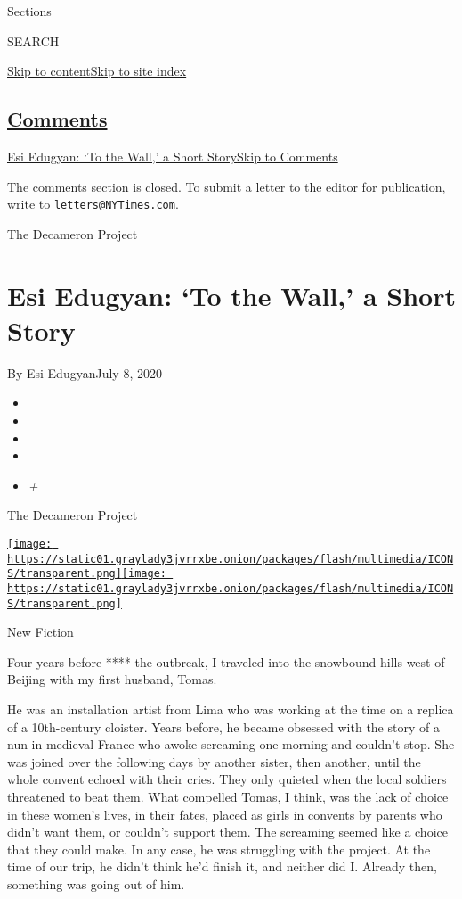 Sections

SEARCH

\protect\hyperlink{site-content}{Skip to
content}\protect\hyperlink{site-index}{Skip to site index}

\hypertarget{comments}{%
\subsection{\texorpdfstring{\protect\hyperlink{commentsContainer}{Comments}}{Comments}}\label{comments}}

\href{}{Esi Edugyan: `To the Wall,' a Short Story}\href{}{Skip to
Comments}

The comments section is closed. To submit a letter to the editor for
publication, write to
\href{mailto:letters@NYTimes.com}{\nolinkurl{letters@NYTimes.com}}.

The Decameron Project

\hypertarget{esi-edugyan-to-the-wall-a-short-story}{%
\section{Esi Edugyan: `To the Wall,' a Short
Story}\label{esi-edugyan-to-the-wall-a-short-story}}

By Esi EdugyanJuly 8, 2020

\begin{itemize}
\item
\item
\item
\item
\item
  \emph{+}
\end{itemize}

The Decameron Project

\href{https://www.nytimes3xbfgragh.onion/section/magazine}{\texttt{[image: https://static01.graylady3jvrrxbe.onion/packages/flash/multimedia/ICONS/transparent.png]}\texttt{[image: https://static01.graylady3jvrrxbe.onion/packages/flash/multimedia/ICONS/transparent.png]}}

New Fiction

Four years before **** the outbreak, I traveled into the snowbound hills
west of Beijing with my first husband, Tomas.

He was an installation artist from Lima who was working at the time on a
replica of a 10th-century cloister. Years before, he became obsessed
with the story of a nun in medieval France who awoke screaming one
morning and couldn't stop. She was joined over the following days by
another sister, then another, until the whole convent echoed with their
cries. They only quieted when the local soldiers threatened to beat
them. What compelled Tomas, I think, was the lack of choice in these
women's lives, in their fates, placed as girls in convents by parents
who didn't want them, or couldn't support them. The screaming seemed
like a choice that they could make. In any case, he was struggling with
the project. At the time of our trip, he didn't think he'd finish it,
and neither did I. Already then, something was going out of him.

